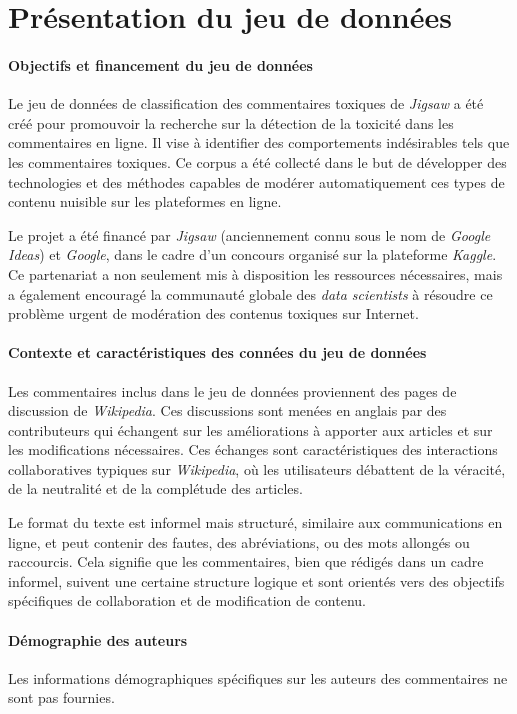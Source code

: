
\chapter{Présentation du jeu de données}

\subsubsection*{Objectifs et financement du jeu de données}
Le jeu de données de classification des commentaires toxiques de \textit{Jigsaw} a été créé pour promouvoir la recherche sur la détection de la toxicité dans les commentaires en ligne.
Il vise à identifier des comportements indésirables tels que les commentaires toxiques.
Ce corpus a été collecté dans le but de développer des technologies et des méthodes capables de modérer automatiquement ces types de contenu nuisible sur les plateformes en ligne.

Le projet a été financé par \textit{Jigsaw} (anciennement connu sous le nom de \textit{Google Ideas}) et \textit{Google}, dans le cadre d'un concours organisé sur la plateforme \textit{Kaggle}. 
Ce partenariat a non seulement mis à disposition les ressources nécessaires, mais a également encouragé la communauté globale des \textit{data scientists} à résoudre ce problème urgent de modération des contenus toxiques sur Internet.

\subsubsection*{Contexte et caractéristiques des connées du jeu de données }
Les commentaires inclus dans le jeu de données proviennent des pages de discussion de \textit{Wikipedia}. 
Ces discussions sont menées en anglais par des contributeurs qui échangent sur les améliorations à apporter aux articles et sur les modifications nécessaires. 
Ces échanges sont caractéristiques des interactions collaboratives typiques sur \textit{Wikipedia}, où les utilisateurs débattent de la véracité, de la neutralité et de la complétude des articles.

Le format du texte est informel mais structuré, similaire aux communications en ligne, et peut contenir des fautes, des abréviations, ou des mots allongés ou raccourcis.
Cela signifie que les commentaires, bien que rédigés dans un cadre informel, suivent une certaine structure logique et sont orientés vers des objectifs spécifiques de collaboration et de modification de contenu.

\subsubsection*{Démographie des auteurs}
Les informations démographiques spécifiques sur les auteurs des commentaires ne sont pas fournies.

